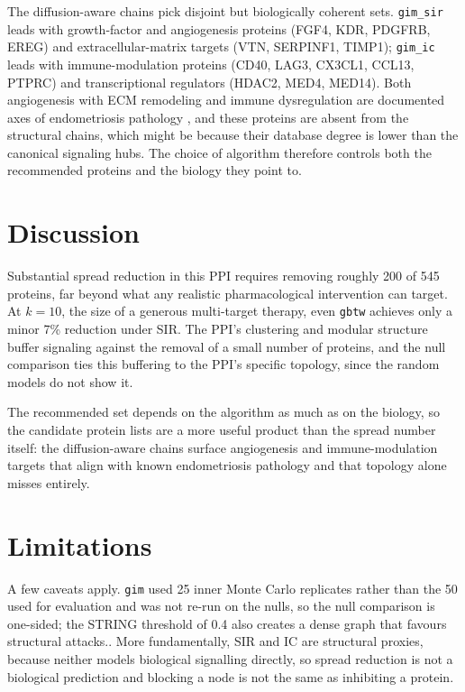 \documentclass[9pt,a4paper,twocolumn,twoside]{tau-class/tau}
\begin{document}
    The diffusion-aware chains pick disjoint but biologically coherent sets. \texttt{gim\_sir} leads with growth-factor and angiogenesis proteins (FGF4, KDR, PDGFRB, EREG) and extracellular-matrix targets (VTN, SERPINF1, TIMP1); \texttt{gim\_ic} leads with immune-modulation proteins (CD40, LAG3, CX3CL1, CCL13, PTPRC) and transcriptional regulators (HDAC2, MED4, MED14). Both angiogenesis with ECM remodeling and immune dysregulation are documented axes of endometriosis pathology \supercite{bulun2009endometriosis}, and these proteins are absent from the structural chains, which might be because their database degree is lower than the canonical signaling hubs. The choice of algorithm therefore controls both the recommended proteins and the biology they point to.

\section{Discussion}

Substantial spread reduction in this PPI requires removing roughly 200 of 545 proteins, far beyond what any realistic pharmacological intervention can target. At $k = 10$, the size of a generous multi-target therapy, even \texttt{gbtw} achieves only a minor 7\% reduction under SIR. The PPI's clustering and modular structure buffer signaling against the removal of a small number of proteins, and the null comparison ties this buffering to the PPI's specific topology, since the random models do not show it.

The recommended set depends on the algorithm as much as on the biology, so the candidate protein lists are a more useful product than the spread number itself: the diffusion-aware chains surface angiogenesis and immune-modulation targets that align with known endometriosis pathology \supercite{bulun2009endometriosis} and that topology alone misses entirely.

\section{Limitations}

A few caveats apply. \texttt{gim} used 25 inner Monte Carlo replicates rather than the 50 used for evaluation and was not re-run on the nulls, so the null comparison is one-sided; the STRING threshold of 0.4 also creates a dense graph that favours structural attacks.. More fundamentally, SIR and IC are structural proxies, because neither models biological signalling directly, so spread reduction is not a biological prediction and blocking a node is not the same as inhibiting a protein.
\end{document}
